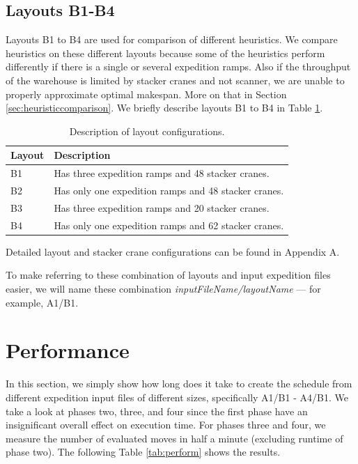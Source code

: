 \documentclass{ctuthesis}
\begin{document}
\subsection{Layouts B1-B4}
\label{subsec:B}

Layouts B1 to B4 are used for comparison of different heuristics. We compare heuristics on these different layouts because some of the heuristics perform differently if there is a single or several expedition ramps. Also if the throughput of the warehouse is limited by stacker cranes and not scanner, we are unable to properly approximate optimal makespan. More on that in Section \ref{sec:heuristiccomparison}. We briefly describe layouts B1 to B4 in Table \ref{tab:bees}. 


\begin{table}[H]
\begin{tabular}{ l l } 
\hline
 Layout & Description\\ 
\hline
B1 & Has three expedition ramps and 48 stacker cranes.\\
B2 & Has only one expedition ramps and 48 stacker cranes.\\
B3 & Has three expedition ramps and 20 stacker cranes.\\
B4 & Has only one expedition ramps and 62 stacker cranes.\\
\hline
\end{tabular}
\caption{Description of layout configurations.} \label{tab:bees}
\end{table}


Detailed layout and stacker crane configurations can be found in Appendix A.

To make referring to these combination of layouts and input expedition files easier, we will name these combination \emph{inputFileName/layoutName} — for example, A1/B1.

\section{Performance}

In this section, we simply show how long does it take to create the schedule from different expedition input files of different sizes, specifically A1/B1 - A4/B1. We take a look at phases two, three, and four since the first phase have an insignificant overall effect on execution time. For phases three and four, we measure the number of evaluated moves in half a minute (excluding runtime of phase two). The following Table \ref{tab:perform} shows the results.
\end{document}
